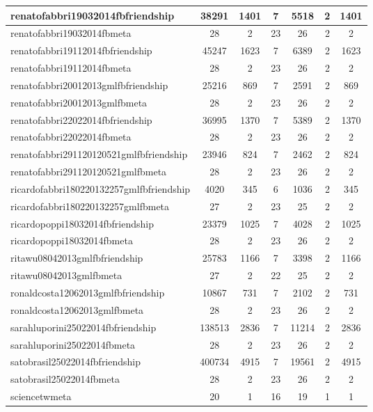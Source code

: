 \begin{table*}[h!]
\begin{center}
\begin{tabular}{| l | c | c | c | c | c | c |}
renatofabbri19032014fbfriendship & 38291  & 1401  & 7  & 5518  & 2  & 1401 \\\hline
renatofabbri19032014fbmeta & 28  & 2  & 23  & 26  & 2  & 2 \\\hline
renatofabbri19112014fbfriendship & 45247  & 1623  & 7  & 6389  & 2  & 1623 \\\hline
renatofabbri19112014fbmeta & 28  & 2  & 23  & 26  & 2  & 2 \\\hline
renatofabbri20012013gmlfbfriendship & 25216  & 869  & 7  & 2591  & 2  & 869 \\\hline
renatofabbri20012013gmlfbmeta & 28  & 2  & 23  & 26  & 2  & 2 \\\hline
renatofabbri22022014fbfriendship & 36995  & 1370  & 7  & 5389  & 2  & 1370 \\\hline
renatofabbri22022014fbmeta & 28  & 2  & 23  & 26  & 2  & 2 \\\hline
renatofabbri291120120521gmlfbfriendship & 23946  & 824  & 7  & 2462  & 2  & 824 \\\hline
renatofabbri291120120521gmlfbmeta & 28  & 2  & 23  & 26  & 2  & 2 \\\hline
ricardofabbri180220132257gmlfbfriendship & 4020  & 345  & 6  & 1036  & 2  & 345 \\\hline
ricardofabbri180220132257gmlfbmeta & 27  & 2  & 23  & 25  & 2  & 2 \\\hline
ricardopoppi18032014fbfriendship & 23379  & 1025  & 7  & 4028  & 2  & 1025 \\\hline
ricardopoppi18032014fbmeta & 28  & 2  & 23  & 26  & 2  & 2 \\\hline
ritawu08042013gmlfbfriendship & 25783  & 1166  & 7  & 3398  & 2  & 1166 \\\hline
ritawu08042013gmlfbmeta & 27  & 2  & 22  & 25  & 2  & 2 \\\hline
ronaldcosta12062013gmlfbfriendship & 10867  & 731  & 7  & 2102  & 2  & 731 \\\hline
ronaldcosta12062013gmlfbmeta & 28  & 2  & 23  & 26  & 2  & 2 \\\hline
sarahluporini25022014fbfriendship & 138513  & 2836  & 7  & 11214  & 2  & 2836 \\\hline
sarahluporini25022014fbmeta & 28  & 2  & 23  & 26  & 2  & 2 \\\hline
satobrasil25022014fbfriendship & 400734  & 4915  & 7  & 19561  & 2  & 4915 \\\hline
satobrasil25022014fbmeta & 28  & 2  & 23  & 26  & 2  & 2 \\\hline
sciencetwmeta & 20  & 1  & 16  & 19  & 1  & 1 \\\hline

\end{tabular}
\end{center}
\end{table*}
